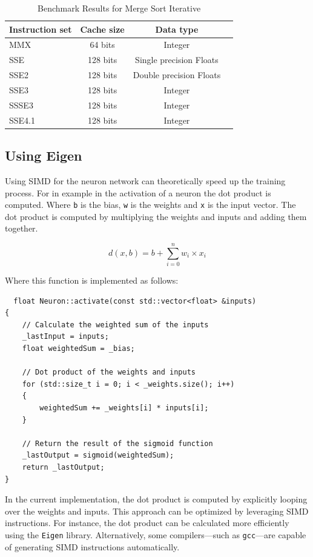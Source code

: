 \documentclass[twoside]{article}
\begin{document}
\begin{table}[H]
  \small
  \caption{Benchmark Results for Merge Sort Iterative }
  \label{tab:mergesort-selected}
  \centering
  \begin{tabular*}{\columnwidth}{@{\extracolsep{\fill}}lccc}
    \hline
    Instruction set &  Cache size &  Data type \\
    \hline
    MMX &  64 bits &  Integer \\
    SSE &  128 bits &  Single precision Floats\\
    SSE2 &  128 bits &  Double precision Floats\\
    SSE3 &  128 bits &  Integer   \\
    SSSE3 &  128 bits &  Integer  \\
    SSE4.1 &  128 bits &  Integer \\
    \hline
  \end{tabular*}
\end{table}

\newpage

\subsection{Using Eigen}
Using SIMD for the neuron network can theoretically speed up the training process.
For in example in the activation of a neuron the dot product is computed.
Where \texttt{b} is the bias, \texttt{w} is the weights and \texttt{x} is the input vector.
The dot product is computed by multiplying the weights and inputs and adding them together.

\begin{equation}
  d (x, b) = b + \sum_{i=0}^{n} w_i \times x_i
\end{equation}

\noindent
Where this function is implemented as follows:

\begin{lstlisting}
  float Neuron::activate(const std::vector<float> &inputs)
{
    // Calculate the weighted sum of the inputs
    _lastInput = inputs;
    float weightedSum = _bias;

    // Dot product of the weights and inputs
    for (std::size_t i = 0; i < _weights.size(); i++)
    {
        weightedSum += _weights[i] * inputs[i];
    }

    // Return the result of the sigmoid function
    _lastOutput = sigmoid(weightedSum);
    return _lastOutput;
}
\end{lstlisting}
In the current implementation, the dot product is computed by explicitly looping over the weights and inputs.
This approach can be optimized by leveraging SIMD instructions.
For instance, the dot product can be calculated more efficiently using the \texttt{Eigen} library.
Alternatively, some compilers—such as \texttt{gcc}—are capable of generating SIMD instructions automatically.
\end{document}
